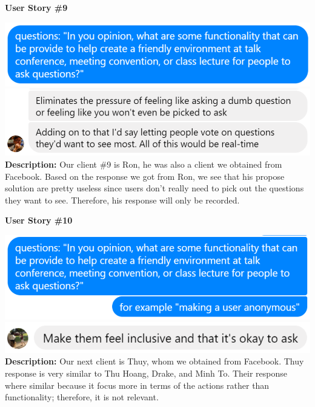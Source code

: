 \documentclass[12pt]{article}
\begin{document}
\textbf{User Story \#9}
\begin{flushleft}
\includegraphics[width=\textwidth]{Assignment5_userstory_9a.eps}
\includegraphics[width=\textwidth]{Assignment5_userstory_9b.eps}
\textbf{Description:} Our client \#9 is Ron, he was also a client we obtained from Facebook. Based on the response we got from Ron, we see that his propose solution are pretty useless since users don't really need to pick out the questions they want to see. Therefore, his response will only be recorded. \newline
\end{flushleft}

\textbf{User Story \#10}
\begin{flushleft}
\includegraphics[width=\textwidth]{Assignment5_userstory_10a.eps}
\includegraphics[width=\textwidth]{Assignment5_userstory_10b.eps}
\textbf{Description:} Our next client is Thuy, whom we obtained from Facebook. Thuy response is very similar to Thu Hoang, Drake, and Minh To. Their response where similar because it focus more in terms of the actions rather than functionality; therefore, it is not relevant. \newline
\end{flushleft}
\end{document}
